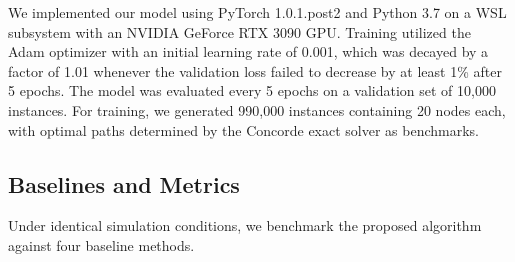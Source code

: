 \documentclass[sigconf]{acmart}
\begin{document}
We implemented our model using PyTorch 1.0.1.post2 and Python 3.7 on a WSL subsystem with an NVIDIA GeForce RTX 3090 GPU. Training utilized the Adam optimizer with an initial learning rate of 0.001, which was decayed by a factor of 1.01 whenever the validation loss failed to decrease by at least 1\% after 5 epochs. The model was evaluated every 5 epochs on a validation set of 10,000 instances. For training, we generated 990,000 instances containing 20 nodes each, with optimal paths determined by the Concorde exact solver as benchmarks.


\subsection{Baselines and Metrics}
Under identical simulation conditions, we benchmark the proposed algorithm against four baseline methods.
\end{document}
